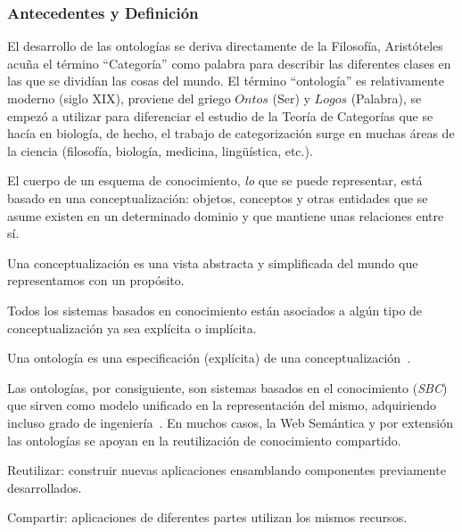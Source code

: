 \subsubsection{Antecedentes y Definición}
El desarrollo de las ontologías se deriva directamente de la Filosofía, 
Aristóteles acuña el término ``Categoría'' como palabra para describir las
diferentes clases en las que se dividían las cosas del mundo. 
El término ``ontología'' es relativamente moderno (siglo XIX), proviene del griego
$Ontos$ (Ser) y $Logos$ (Palabra), se empezó a utilizar para diferenciar el
estudio de la Teoría de Categorías que se hacía en biología, de hecho, el trabajo de categorización surge en muchas áreas de la
ciencia (filosofía, biología, medicina, lingüística, etc.).

El cuerpo de un esquema de conocimiento, \textit{lo} que se puede representar, está basado en una
conceptualización: objetos, conceptos y otras entidades que se asume existen en
un determinado dominio y que mantiene unas relaciones entre sí. 

\begin{definition}
Una conceptualización es una vista abstracta y simplificada del mundo que
representamos con un propósito. 
\end{definition}

\begin{note}
Todos los sistemas basados en conocimiento están
asociados a algún tipo de conceptualización ya sea explícita o implícita. 
\end{note}

\begin{definition}
Una ontología es una especificación (explícita) de una conceptualización~\cite{GruberOnto}.
\end{definition}

Las ontologías, por consiguiente, son sistemas basados en el conocimiento (\textit{\gls{SBC}}) que
sirven como modelo unificado en la representación del mismo, adquiriendo incluso
grado de ingeniería~\cite{isbn1846283965,Benjamins98ontological}. En muchos
casos, la Web Semántica y por extensión las ontologías se apoyan en la
reutilización de conocimiento compartido.
\begin{note}
Reutilizar: construir nuevas aplicaciones ensamblando componentes previamente desarrollados.
\end{note}

\begin{note}
Compartir: aplicaciones de diferentes partes utilizan los mismos recursos.
\end{note}

